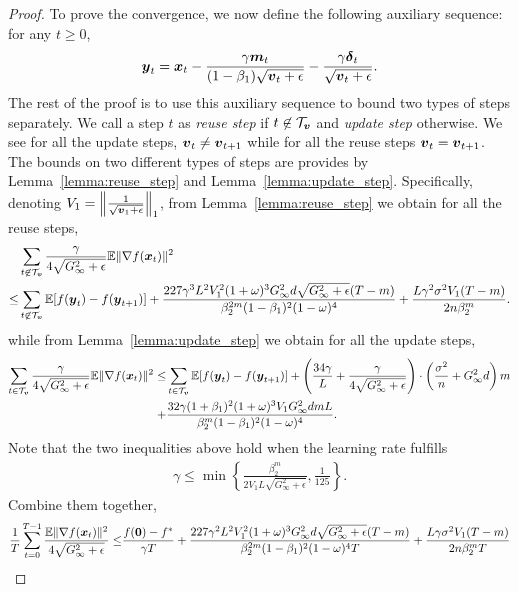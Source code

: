 \begin{proof}
To prove the convergence, we now
define the following auxiliary sequence: for any $t\geq 0$,
\begin{align*}
    \boldsymbol{y}_t = \boldsymbol{x}_t - \frac{\gamma\boldsymbol{m}_t}{(1-\beta_1)\sqrt{\boldsymbol{v}_{t}+\epsilon}} - \frac{\gamma\boldsymbol{\delta}_{t}}{\sqrt{\boldsymbol{v}_{t}+\epsilon}}.
\end{align*}
The rest of the proof is to use this auxiliary sequence to bound two types of steps separately. We call a step $t$ as \emph{reuse step} if $t\not\in\mathcal{T}_{\boldsymbol{v}}$ and \emph{update step} otherwise. We see for all the update steps, $\boldsymbol{v}_{t}\neq\boldsymbol{v}_{t+1}$ while for all the reuse steps $\boldsymbol{v}_{t}=\boldsymbol{v}_{t+1}$. 
The bounds on two different types of steps are provides by Lemma~\ref{lemma:reuse_step} and Lemma~\ref{lemma:update_step}. Specifically, denoting $V_1 = \left\| \frac{1}{\sqrt{\boldsymbol{v}_1+\epsilon}}\right\|_1$,
from Lemma~\ref{lemma:reuse_step} we obtain for all the reuse steps,
\begin{align*}
    & \sum_{t\not\in\mathcal{T}_{\boldsymbol{v}}}\frac{\gamma}{4\sqrt{G_\infty^2+\epsilon}}\mathbb{E}\|\nabla f(\boldsymbol{x}_t)\|^2 \\
    \leq & \sum_{t\not\in\mathcal{T}_{\boldsymbol{v}}}\mathbb{E}[f(\boldsymbol{y}_{t}) - f(\boldsymbol{y}_{t+1})] + \frac{227\gamma^3L^2V_1^2(1+\omega)^3G_\infty^2d\sqrt{G_\infty^2+\epsilon}(T-m)}{\beta_2^{2m}(1-\beta_1)^2(1-\omega)^4} + \frac{L\gamma^2\sigma^2V_1(T-m)}{2n\beta_2^m}.
\end{align*}
while from Lemma~\ref{lemma:update_step} we obtain for all the update steps,
\begin{align*}
    \sum_{t\in\mathcal{T}_{\boldsymbol{v}}}\frac{\gamma}{4\sqrt{G_\infty^2+\epsilon}}\mathbb{E}\|\nabla f(\boldsymbol{x}_t)\|^2 \leq & \sum_{t\in\mathcal{T}_{\boldsymbol{v}}}\mathbb{E}[f(\boldsymbol{y}_{t}) - f(\boldsymbol{y}_{t+1})] + \left( \frac{34\gamma}{L}+\frac{\gamma}{4\sqrt{G_\infty^2+\epsilon}}\right)\cdot\left(\frac{\sigma^2}{n} + G_\infty^2d\right)m \\
+ & \frac{32\gamma(1+\beta_1)^2(1+\omega)^3V_1G_\infty^2dmL}{\beta_2^m(1-\beta_1)^2(1-\omega)^4}.
\end{align*}
Note that the two inequalities above hold when the learning rate fulfills
\begin{align*}
    \gamma \leq \min\left\{ \frac{\beta_2^m}{2V_1L\sqrt{G_\infty^2+\epsilon}},\frac{1}{125}\right\}.
\end{align*}
Combine them together,
\begin{align*}
    \frac{1}{T}\sum_{t=0}^{T-1}\frac{\mathbb{E}\|\nabla f(\*x_t)\|^2}{4\sqrt{G_\infty^2+\epsilon}} \leq & \frac{f(\*0) - f^*}{\gamma T} + \frac{227\gamma^2L^2V_1^2(1+\omega)^3G_\infty^2d\sqrt{G_\infty^2+\epsilon}(T-m)}{\beta_2^{2m}(1-\beta_1)^2(1-\omega)^4T} + \frac{L\gamma\sigma^2V_1(T-m)}{2n\beta_2^mT} \\

\end{align*}
\end{proof}
